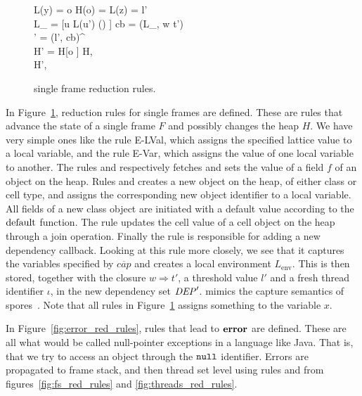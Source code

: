 \begin{figure}[]
  \RuleSpace{}

  {L(y) = o \andalso H(o) =  \andalso L(z) = l' \\
  L_{} = [u \mapsto L(u') \mid () \in {}]
  \andalso cb = (L_{}, w \Rightarrow t') \\
  \iota{} \andalso \DEP' = \DEP \cup (l', cb)^\iota \\
  H' = H[o \mapsto {}] }
  { H,  \\ \FRedTo \;
  H',  }
  \caption{\RACL{} single frame reduction rules.}
  \label{fig:frame_red_rules}
\end{figure}

In Figure~\ref{fig:frame_red_rules}, reduction rules for single frames are
defined. These are rules that advance the state of a single frame $F$ and
possibly changes the heap $H$. We have very simple ones like the rule {\sc
E-LVal}, which assigns the specified lattice value to a local variable, and the
rule {\sc E-Var}, which assigns the value of one local variable to another.
The rules \ESelect{} and \EAssign{} respectively fetches and sets the value of a
field $f$ of an object on the heap. Rules \ENew{} and \ENewCell{} creates a new
object on the heap, of either class or cell type, and assigns the corresponding
new object identifier to a local variable. All fields of a new class object are
initiated with a default value according to the $\mbox{$\mathrm{default}$}$ function. The rule
\EPut{} updates the cell value of a cell object on the heap through a join
operation.  Finally the rule \EWhen{} is responsible for adding a new dependency
callback. Looking at this rule more closely, we see that it captures the
variables specified by $\overline{cap}$ and creates a local environment
$L_{\text{env}}$. This is then stored, together with the closure $w \Rightarrow
t'$, a threshold value $l'$ and a fresh thread identifier $\iota$, in the new
dependency set $\mathit{DEP}'$. \EWhen{} mimics the capture semantics of
spores~\parencite{conf/ecoop/MillerHO14}.  Note that all rules in
Figure~\ref{fig:frame_red_rules} assigns something to the variable $x$.


In Figure~\ref{fig:error_red_rules}, rules that lead to $\mbox{{\bf error}}$ are defined. These
are all what would be called null-pointer exceptions in a language like Java.
That is, that we try to access an object through the $\mbox{\mdseries\texttt{null}}$ identifier.
Errors are propagated to frame stack, and then thread set level using rules
\EErrorFS{} and \EErrorP{} from figures~\ref{fig:fs_red_rules} and
\ref{fig:threads_red_rules}.

